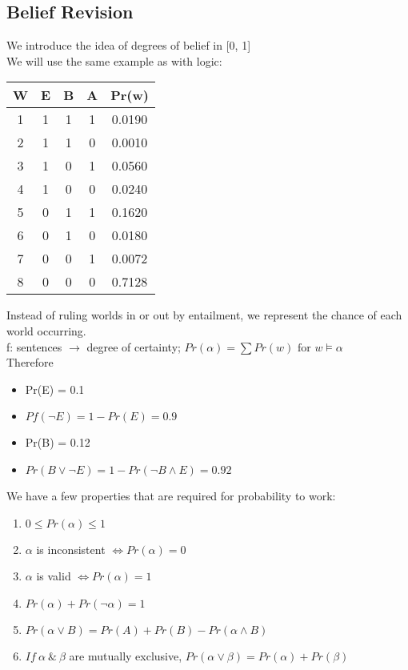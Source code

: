 \documentclass[../../lecture_notes.tex]{subfiles}
\begin{document}
\subsection*{Belief Revision}
\noindent We introduce the idea of degrees of belief in [0, 1]\\
We will use the same example as with logic:

\begin{center}\begin{minipage}{0.3\textwidth}
\begin{tabular} { | c | c | c | c | c | }\hline
	W & E & B & A & Pr(w)\\\hline
	1 & 1 & 1 & 1 & 0.0190\\\hline
	2 & 1 & 1 & 0 & 0.0010\\\hline
	3 & 1 & 0 & 1 & 0.0560\\\hline
	4 & 1 & 0 & 0 & 0.0240\\\hline
	5 & 0 & 1 & 1 & 0.1620\\\hline
	6 & 0 & 1 & 0 & 0.0180\\\hline
	7 & 0 & 0 & 1 & 0.0072\\\hline
	8 & 0 & 0 & 0 & 0.7128\\\hline
\end{tabular}\end{minipage}%
\begin{minipage}{0.7\textwidth}
\noindent Instead of ruling worlds in or out by entailment, we represent the chance of each world occurring.\\
\indent f: sentences $\rightarrow$ degree of certainty; $Pr(\alpha) = \sum Pr(w) \text{ for } w \models \alpha$\\
Therefore \begin{itemize} [itemsep=0mm]
	\item Pr(E) = 0.1
	\item $Pf(\neg E) = 1 - Pr(E) = 0.9$
	\item Pr(B) = 0.12
	\item $Pr(B \lor \neg E) = 1 - Pr(\neg B \land E) = 0.92$
\end{itemize}\end{minipage}\end{center}

\noindent We have a few properties that are required for probability to work:
	\begin{enumerate} [itemsep=0mm]
		\item $0 \leq Pr(\alpha) \leq 1$
		\item $\alpha$ is inconsistent $\iff Pr(\alpha) = 0$
		\item $\alpha$ is valid $\iff Pr(\alpha) = 1$
		\item $Pr(\alpha) + Pr(\neg\alpha) = 1$
		\item $Pr(\alpha\lor B) = Pr(A) + Pr(B) - Pr(\alpha \land B)$
		\item $If \ \alpha\ \&\ \beta$ are mutually exclusive, $Pr(\alpha\lor\beta) = Pr(\alpha) + Pr(\beta)$
	\end{enumerate}
\end{document}
